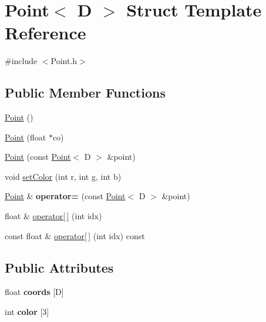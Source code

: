 \hypertarget{structPoint}{\section{Point$<$ D $>$ Struct Template Reference}
\label{structPoint}
}


{\ttfamily \#include $<$Point.\-h$>$}

\subsection*{Public Member Functions}
\begin{DoxyCompactItemize}
\item 
\hyperlink{structPoint_aeee1908b65777b39f4caf849b7cb8ecb}{Point} ()
\item 
\hyperlink{structPoint_a6af9739117ba5896753f570b8bcc7846}{Point} (float $\ast$co)
\item 
\hyperlink{structPoint_a42b2c2ba9a7dea4003c012e8e5fea625}{Point} (const \hyperlink{structPoint}{Point}$<$ D $>$ \&point)
\item 
void \hyperlink{structPoint_a5fb0754a95e46f76180141105b160e1b}{set\-Color} (int r, int g, int b)
\item 
\hypertarget{structPoint_a9aa4a8ba953e7d36e2c8c68059ac1c36}{\hyperlink{structPoint}{Point} \& {\bfseries operator=} (const \hyperlink{structPoint}{Point}$<$ D $>$ \&point)}\label{structPoint_a9aa4a8ba953e7d36e2c8c68059ac1c36}

\item 
float \& \hyperlink{structPoint_a1a7e8252e8d428d8b2cf0a802d00c687}{operator\mbox{[}$\,$\mbox{]}} (int idx)
\item 
const float \& \hyperlink{structPoint_a1cb1045aa734303c07625ecba927fa84}{operator\mbox{[}$\,$\mbox{]}} (int idx) const 
\end{DoxyCompactItemize}
\subsection*{Public Attributes}
\begin{DoxyCompactItemize}
\item 
\hypertarget{structPoint_a7d7d156cc3315dbb82aa63df013f97cc}{float {\bfseries coords} \mbox{[}D\mbox{]}}\label{structPoint_a7d7d156cc3315dbb82aa63df013f97cc}

\item 
\hypertarget{structPoint_a87acdec6769f31eba5eb1754495fb7da}{int {\bfseries color} \mbox{[}3\mbox{]}}\label{structPoint_a87acdec6769f31eba5eb1754495fb7da}

\end{DoxyCompactItemize}
